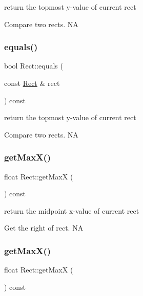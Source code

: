 return the topmost y-\/value of current rect 

Compare two rects.  NA \mbox{\label{classRect_af18d9c2a452430601e398fec58f4c8d3}} 
\subsubsection{\texorpdfstring{equals()}{equals()}\hspace{0.1cm}{\footnotesize\ttfamily [2/2]}}
{\footnotesize\ttfamily bool Rect\+::equals (\begin{DoxyParamCaption}\item[{const \hyperlink{classRect}{Rect} \&}]{rect }\end{DoxyParamCaption}) const}



return the topmost y-\/value of current rect 

Compare two rects.  NA \mbox{\label{classRect_a12e69431d11ad75d3cee64e6809325c8}} 
\subsubsection{\texorpdfstring{get\+Max\+X()}{getMaxX()}\hspace{0.1cm}{\footnotesize\ttfamily [1/2]}}
{\footnotesize\ttfamily float Rect\+::get\+MaxX (\begin{DoxyParamCaption}{ }\end{DoxyParamCaption}) const}



return the midpoint x-\/value of current rect 

Get the right of rect.  NA \mbox{\label{classRect_a12e69431d11ad75d3cee64e6809325c8}} 
\subsubsection{\texorpdfstring{get\+Max\+X()}{getMaxX()}\hspace{0.1cm}{\footnotesize\ttfamily [2/2]}}
{\footnotesize\ttfamily float Rect\+::get\+MaxX (\begin{DoxyParamCaption}{ }\end{DoxyParamCaption}) const}



